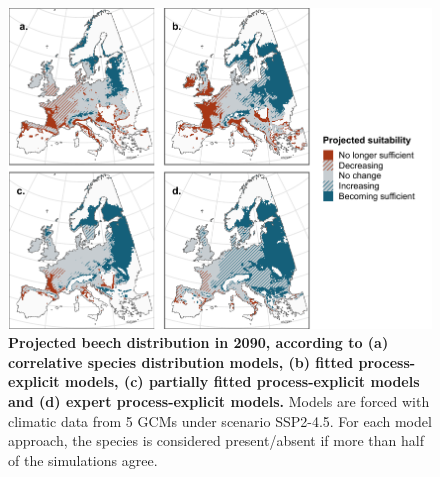 \begin{figure}[t]
\centering
\begin{subcaptiongroup}
\label{fig:fagusA} 
\label{fig:fagusB}
\label{fig:fagusC}
\end{subcaptiongroup}
\includegraphics[width = 20cm]{chapter4/figs/fagus_distributions-1.pdf}
\caption{\textbf{Projected beech distribution in 2090, according to (a) correlative species distribution models, (b) fitted process-explicit models, (c) partially fitted process-explicit models and (d) expert process-explicit models.} Models are forced with climatic data from 5 GCMs under scenario SSP2-4.5. For each model approach, the species is considered present/absent if more than half of the simulations agree.}
\label{fig:fagus}
\end{figure}

